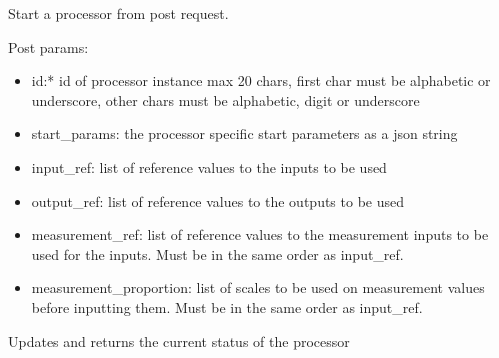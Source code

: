 \documentclass[letterpaper,10pt,english]{sphinxmanual}
\begin{document}
\begin{fulllineitems}
\label{\detokenize{src.processors:src.processors.views.processor_start}}
Start a processor from post request.

Post params:
\begin{itemize}
\item {} 
id:* id of processor instance
max 20 chars, first char must be alphabetic or underscore, other chars must be alphabetic, digit or underscore

\item {} 
start\_params: the processor specific start parameters as a json string

\item {} 
input\_ref: list of reference values to the inputs to be used

\item {} 
output\_ref: list of reference values to the outputs to be used

\item {} 
measurement\_ref: list of reference values to the measurement inputs to be used for the inputs.
Must be in the same order as input\_ref.

\item {} 
measurement\_proportion: list of scales to be used on measurement values before inputting them.
Must be in the same order as input\_ref.

\end{itemize}

\end{fulllineitems}


\begin{fulllineitems}
\label{\detokenize{src.processors:src.processors.views.processor_status}}
Updates and returns the current status of the processor

\end{fulllineitems}

\end{document}

